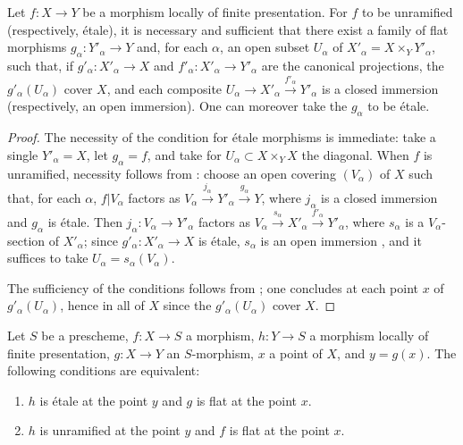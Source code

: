 \begin{corollary}[18.4.8]
\label{IV.18.4.8}
Let $f:X\to Y$ be a morphism locally of finite presentation.
For $f$ to be unramified \textup{(respectively,} \'etale\textup{)}, it is necessary and sufficient that there exist a family of flat morphisms $g_\alpha:Y'_\alpha\to Y$ and, for each $\alpha$, an open subset $U_\alpha$ of $X'_\alpha=X\times_Y Y'_\alpha$, such that, if $g'_\alpha:X'_\alpha\to X$ and $f'_\alpha:X'_\alpha\to Y'_\alpha$ are the canonical projections, the $g'_\alpha(U_\alpha)$ cover $X$, and each composite $U_\alpha\to X'_\alpha\xrightarrow{f'_\alpha}Y'_\alpha$ is a closed immersion \textup{(respectively,} an open immersion\textup{)}.
One can moreover take the $g_\alpha$ to be \'etale.
\end{corollary}

\begin{proof}
The necessity of the condition for \'etale morphisms is immediate: take a single $Y'_\alpha=X$, let $g_\alpha=f$, and take for $U_\alpha\subset X\times_Y X$ the diagonal.
When $f$ is unramified, necessity follows from : choose an open covering $(V_\alpha)$ of $X$ such that, for each $\alpha$, $f|V_\alpha$ factors as $V_\alpha\xrightarrow{j_\alpha}Y'_\alpha\xrightarrow{g_\alpha}Y$, where $j_\alpha$ is a closed immersion and $g_\alpha$ is \'etale.
Then $j_\alpha:V_\alpha\to Y'_\alpha$ factors as $V_\alpha\xrightarrow{s_\alpha}X'_\alpha\xrightarrow{f'_\alpha}Y'_\alpha$, where $s_\alpha$ is a $V_\alpha$-section of $X'_\alpha$; since $g'_\alpha:X'_\alpha\to X$ is \'etale, $s_\alpha$ is an open immersion , and it suffices to take $U_\alpha=s_\alpha(V_\alpha)$.

The sufficiency of the conditions follows from ;
one concludes at each point $x$ of $g'_\alpha(U_\alpha)$, hence in all of $X$ since the $g'_\alpha(U_\alpha)$ cover $X$.
\end{proof}

\begin{proposition}[18.4.9]
\label{IV.18.4.9}
Let $S$ be a prescheme, $f:X\to S$ a morphism, $h:Y\to S$ a morphism locally of finite presentation, $g:X\to Y$ an $S$-morphism, $x$ a point of $X$, and $y=g(x)$.
The following conditions are equivalent:
\begin{enumerate}[label=\emph{\alph*)}]
  \item $h$ is \'etale at the point $y$ and $g$ is flat at the point $x$.
  \item $h$ is unramified at the point $y$ and $f$ is flat at the point $x$.
\end{enumerate}
\end{proposition}

